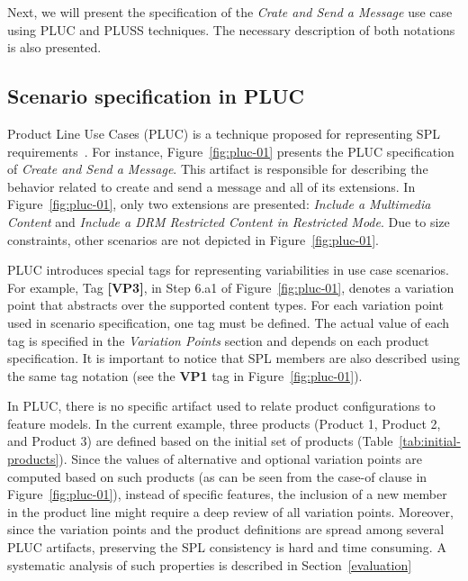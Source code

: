 \documentclass{acm_proc_article-sp}
\begin{document}
Next, we will present the specification of the \emph{Crate and Send a Message} use case using PLUC and PLUSS techniques. The necessary description of both notations is also presented.  

\subsection{Scenario specification in PLUC}
\label{sub:pluc}

Product Line Use Cases (PLUC) is a technique proposed for representing SPL requirements~\cite{bertolino-esec-2003}.  For instance, Figure~\ref{fig:pluc-01} presents 
the PLUC specification of \emph{Create and Send a Message}. This artifact is responsible for describing the behavior related to create and send a message and 
all of its extensions. In Figure~\ref{fig:pluc-01}, only two extensions are presented: \emph{Include a Multimedia Content} and 
\emph{Include a DRM Restricted Content in Restricted Mode}. Due to size constraints, other scenarios are not depicted in Figure~\ref{fig:pluc-01}. 


PLUC introduces special tags for representing variabilities in use case scenarios.  For example, Tag {\bf [VP3]}, in Step 6.a1 of Figure~\ref{fig:pluc-01}, denotes a variation 
point that abstracts over the supported content types. For each variation point used in scenario specification, one tag must be defined.
The actual value of each tag is specified in the \emph{Variation Points} section and depends on each product specification. It is important to notice 
that SPL members are also described using the same tag notation (see the {\bf VP1} tag in Figure~\ref{fig:pluc-01}). 

In PLUC, there is no specific artifact used to relate product configurations to feature models. In the current example, 
three products (Product 1, Product 2, and Product 3) are defined based on the initial set of products (Table~\ref{tab:initial-products}). Since the values of alternative and optional variation 
points are computed based on such products (as can be seen from the case-of clause in Figure~\ref{fig:pluc-01}), instead of specific features, the inclusion of a new member in the product line might require a deep review of 
all variation points. Moreover, since the variation points and the product definitions are spread among several PLUC artifacts, preserving the SPL consistency is 
hard and time consuming. A systematic analysis of such properties is described in Section~\ref{evaluation} 
\end{document}
